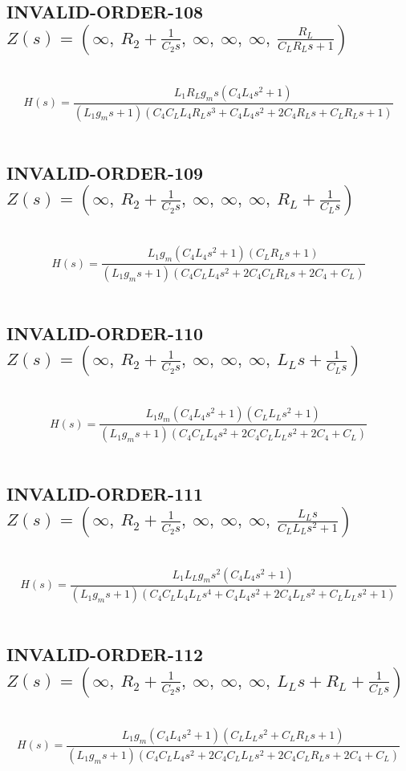 \documentclass{article}
\begin{document}
\subsection{INVALID-ORDER-108 $Z(s) = \left( \infty, \  R_{2} + \frac{1}{C_{2} s}, \  \infty, \  \infty, \  \infty, \  \frac{R_{L}}{C_{L} R_{L} s + 1}\right)$ } \ 
\textbf{\[H(s) = \frac{L_{1} R_{L} g_{m} s \left(C_{4} L_{4} s^{2} + 1\right)}{\left(L_{1} g_{m} s + 1\right) \left(C_{4} C_{L} L_{4} R_{L} s^{3} + C_{4} L_{4} s^{2} + 2 C_{4} R_{L} s + C_{L} R_{L} s + 1\right)}\] } \ 
\subsection{INVALID-ORDER-109 $Z(s) = \left( \infty, \  R_{2} + \frac{1}{C_{2} s}, \  \infty, \  \infty, \  \infty, \  R_{L} + \frac{1}{C_{L} s}\right)$ } \ 
\textbf{\[H(s) = \frac{L_{1} g_{m} \left(C_{4} L_{4} s^{2} + 1\right) \left(C_{L} R_{L} s + 1\right)}{\left(L_{1} g_{m} s + 1\right) \left(C_{4} C_{L} L_{4} s^{2} + 2 C_{4} C_{L} R_{L} s + 2 C_{4} + C_{L}\right)}\] } \ 
\subsection{INVALID-ORDER-110 $Z(s) = \left( \infty, \  R_{2} + \frac{1}{C_{2} s}, \  \infty, \  \infty, \  \infty, \  L_{L} s + \frac{1}{C_{L} s}\right)$ } \ 
\textbf{\[H(s) = \frac{L_{1} g_{m} \left(C_{4} L_{4} s^{2} + 1\right) \left(C_{L} L_{L} s^{2} + 1\right)}{\left(L_{1} g_{m} s + 1\right) \left(C_{4} C_{L} L_{4} s^{2} + 2 C_{4} C_{L} L_{L} s^{2} + 2 C_{4} + C_{L}\right)}\] } \ 
\subsection{INVALID-ORDER-111 $Z(s) = \left( \infty, \  R_{2} + \frac{1}{C_{2} s}, \  \infty, \  \infty, \  \infty, \  \frac{L_{L} s}{C_{L} L_{L} s^{2} + 1}\right)$ } \ 
\textbf{\[H(s) = \frac{L_{1} L_{L} g_{m} s^{2} \left(C_{4} L_{4} s^{2} + 1\right)}{\left(L_{1} g_{m} s + 1\right) \left(C_{4} C_{L} L_{4} L_{L} s^{4} + C_{4} L_{4} s^{2} + 2 C_{4} L_{L} s^{2} + C_{L} L_{L} s^{2} + 1\right)}\] } \ 
\subsection{INVALID-ORDER-112 $Z(s) = \left( \infty, \  R_{2} + \frac{1}{C_{2} s}, \  \infty, \  \infty, \  \infty, \  L_{L} s + R_{L} + \frac{1}{C_{L} s}\right)$ } \ 
\textbf{\[H(s) = \frac{L_{1} g_{m} \left(C_{4} L_{4} s^{2} + 1\right) \left(C_{L} L_{L} s^{2} + C_{L} R_{L} s + 1\right)}{\left(L_{1} g_{m} s + 1\right) \left(C_{4} C_{L} L_{4} s^{2} + 2 C_{4} C_{L} L_{L} s^{2} + 2 C_{4} C_{L} R_{L} s + 2 C_{4} + C_{L}\right)}\] } \ 
\end{document}

